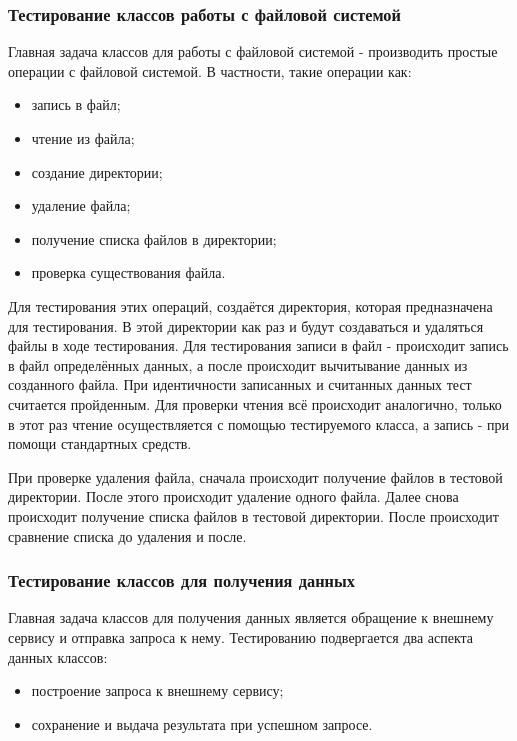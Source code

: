 \subsubsection{Тестирование классов работы с файловой системой}

Главная задача классов для работы с файловой системой - производить простые операции с файловой системой.
В частности, такие операции как:
\begin{itemize}
    \item запись в файл;
    \item чтение из файла;
    \item создание директории;
    \item удаление файла;
    \item получение списка файлов в директории;
    \item проверка существования файла.
\end{itemize}

Для тестирования этих операций, создаётся директория, которая предназначена для тестирования.
В этой директории как раз и будут создаваться и удаляться файлы в ходе тестирования.
Для тестирования записи в файл - происходит запись в файл определённых данных, а после происходит вычитывание данных из созданного файла.
При идентичности записанных и считанных данных тест считается пройденным.
Для проверки чтения всё происходит аналогично, только в этот раз чтение осуществляется с помощью тестируемого класса, а запись - при помощи стандартных средств.

При проверке удаления файла, сначала происходит получение файлов в тестовой директории.
После этого происходит удаление одного файла.
Далее снова происходит получение списка файлов в тестовой директории.
После происходит сравнение списка до удаления и после.

\subsubsection{Тестирование классов для получения данных}

Главная задача классов для получения данных является обращение к внешнему сервису и отправка запроса к нему.
Тестированию подвергается два аспекта данных классов:
\begin{itemize}
    \item построение запроса к внешнему сервису;
    \item сохранение и выдача результата при успешном запросе.
\end{itemize}

